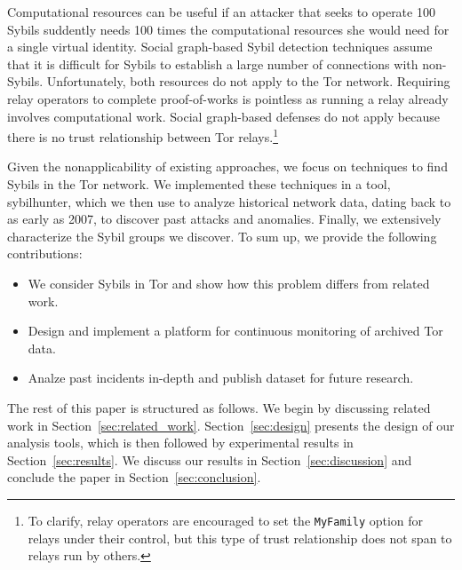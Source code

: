 Computational resources can be useful if an attacker that seeks to
operate 100 Sybils suddently needs 100 times the computational resources she
would need for a single virtual identity.  Social graph-based Sybil detection
techniques assume that it is difficult for Sybils to establish a large number of
connections with non-Sybils.  Unfortunately, both resources do not apply to the
Tor network. Requiring relay operators to complete proof-of-works is pointless
as running a relay already involves computational work.  Social graph-based
defenses do not apply because there is no trust relationship between Tor
relays.\footnote{To clarify, relay operators are encouraged to set the
\texttt{MyFamily} option for relays under their control, but this type of
trust relationship does not span to relays run by others.}

Given the nonapplicability of existing approaches, we focus on techniques to
find Sybils in the Tor network.  We implemented these techniques in a tool,
sybilhunter, which we then use to analyze historical network data, dating back
to as early as 2007, to discover past attacks and anomalies.  Finally, we
extensively characterize the Sybil groups we discover.  To sum up, we provide
the following contributions:
\begin{itemize}
	\item We consider Sybils in Tor and show how this problem differs from
		related work.
	\item Design and implement a platform for continuous monitoring of archived
		Tor data.
	\item Analze past incidents in-depth and publish dataset for future
		research.
\end{itemize}

The rest of this paper is structured as follows.  We begin by discussing
related work in Section~\ref{sec:related_work}.  Section~\ref{sec:design}
presents the design of our analysis tools, which is then followed by
experimental results in Section~\ref{sec:results}.  We discuss our results in
Section~\ref{sec:discussion} and conclude the paper in
Section~\ref{sec:conclusion}.
